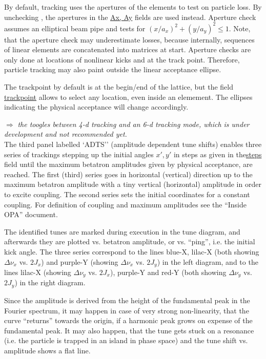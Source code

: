 \documentclass[12pt]{article}
\newcommand\todo[1]{$\Longrightarrow$ {\em #1} }
\newcommand\button[1]{\fbox{\small\bf #1}}
\newcommand\chkbox[1]{\fbox{\small $\circ\,$#1}}
\newcommand\field[1]{\underline{\small #1}}
\begin{document}
By default, tracking uses the apertures of the elements to test on particle loss.
By unchecking \chkbox{element apertures}, the apertures in the \field{Ax, Ay} fields are used instead.
Aperture check assumes an elliptical beam pipe and tests for $(x/a_x)^2+(y/a_y)^2\leq 1$.
Note, that the aperture check may underestimate losses, because internally,
sequences of linear elements are concatenated into matrices at start. Aperture
checks are only done at locations of nonlinear kicks and at the track point.
Therefore, particle tracking may also paint outside the linear acceptance ellipse.

The trackpoint by default is at the begin/end of the lattice, but the field
\field{trackpoint} allows to select any location, even inside an elemement. The ellipses indicating the physical acceptance will change accordingly.

\todo{the \button{4D/6D} toogles between 4-d tracking and an 6-d tracking mode, which is under development and not recommended yet.}\\


The third panel labelled `ADTS'' (amplitude dependent tune shifts) enables three series of trackings
stepping up the initial angles $x',y'$ in steps as given in the\field{steps} field
until the maximum betatron amplitudes given by physical
acceptance, are reached.
The first (third) series goes in horizontal (vertical) direction up to the maximum betatron amplitude with a tiny vertical (horizontal) amplitude in order to excite coupling.
The second series sets the initial coordinates for a constant coupling.
For definition of coupling and maximum amplitudes see the ``Inside OPA'' document.

The identified tunes are marked during execution
in the tune diagram, and afterwards they are plotted vs. betatron amplitude, or vs. ``ping'', i.e. the initial
kick angle. The three series correspond to the lines blue-X, lilac-X
(both showing $\Delta\nu_x$ vs. $2J_x$) and purple-Y (showing $\Delta\nu_x$ vs. $2J_y$) in the
left diagram, and to the lines
lilac-X (showing $\Delta\nu_y$ vs. $2J_x$), purple-Y and red-Y (both showing $\Delta\nu_y$ vs. $2J_y$) in the right diagram.

Since the amplitude is derived from the height of the fundamental peak in the Fourier spectrum, it may happen in case of very strong non-linearity, that the curve ``returns'' towards the origin, if a harmonic peak grows on expense of the fundamental peak. It may also happen, that the tune gets stuck on a resonance (i.e.
the particle is trapped in an island in phase space) and the tune shift vs. amplitude shows a flat line.
\end{document}
